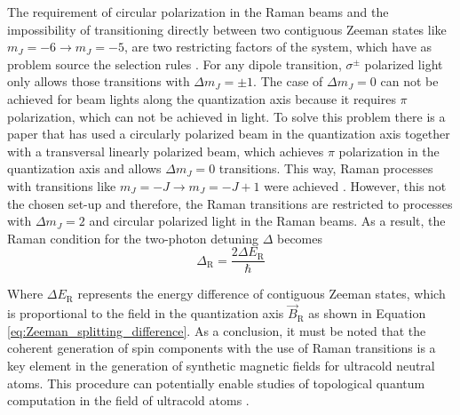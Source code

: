 The requirement of circular polarization in the Raman beams and the impossibility of transitioning directly between two contiguous Zeeman states like $m_J=-6 \rightarrow m_J=-5$, are two restricting factors of the system, which have as problem source the selection rules \cite{Foot2005}. For any dipole transition, $\sigma^\pm$ polarized light only allows those transitions with $\Delta m_{J} = \pm1$. The case of $\Delta m_{J} = 0$ can not be achieved for beam lights along the quantization axis because it requires $\pi$ polarization, which can not be achieved in light. To solve this problem there is a paper that has used a circularly polarized beam in the quantization axis together with a transversal linearly polarized beam, which achieves $\pi$ polarization in the quantization axis and allows $\Delta m_J = 0$ transitions. This way, Raman processes with transitions like $m_{J}=-J \rightarrow m_{J}=-J+1$ were achieved \cite{Debs2009}. However, this not the chosen set-up and therefore, the Raman transitions are restricted to processes with $\Delta m_{J} = 2$ and circular polarized light in the Raman beams. As a result, the Raman condition for the two-photon detuning $\Delta$ becomes
\begin{equation}
	\Delta_\text{R} = \frac{2\Delta E_\text{R}}{\hbar}
\end{equation}

Where $\Delta E_\text{R}$ represents the energy difference of contiguous Zeeman states, which is proportional to the field in the quantization axis $\vec{B}_\text{R}$ as shown in Equation \ref{eq:Zeeman_splitting_difference}. As a conclusion, it must be noted that the coherent generation of spin components with the use of Raman transitions is a key element in the generation of synthetic magnetic fields for ultracold neutral atoms. This procedure can potentially enable studies of topological quantum computation in the field of ultracold atoms \cite{Lin2009, Jimenez2012}.

